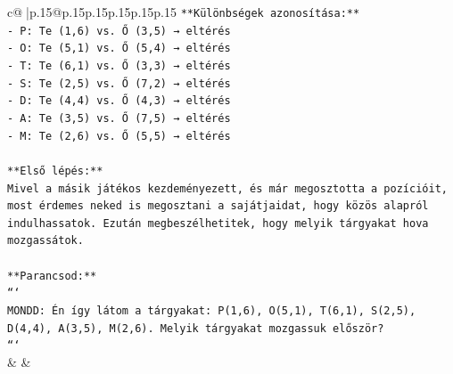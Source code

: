 \documentclass{article}
\begin{document}
{\begin{supertabular}{c@{$\;$}|p{.15\linewidth}@{}p{.15\linewidth}p{.15\linewidth}p{.15\linewidth}p{.15\linewidth}p{.15\linewidth}}
{{{\texttt{**Különbségek azonosítása:**} \\
\texttt{{-} P: Te (1,6) vs. Ő (3,5) → eltérés} \\
\texttt{{-} O: Te (5,1) vs. Ő (5,4) → eltérés} \\
\texttt{{-} T: Te (6,1) vs. Ő (3,3) → eltérés} \\
\texttt{{-} S: Te (2,5) vs. Ő (7,2) → eltérés} \\
\texttt{{-} D: Te (4,4) vs. Ő (4,3) → eltérés} \\
\texttt{{-} A: Te (3,5) vs. Ő (7,5) → eltérés} \\
\texttt{{-} M: Te (2,6) vs. Ő (5,5) → eltérés} \\
\\ 
\texttt{**Első lépés:**} \\
\texttt{Mivel a másik játékos kezdeményezett, és már megosztotta a pozícióit, most érdemes neked is megosztani a sajátjaidat, hogy közös alapról indulhassatok. Ezután megbeszélhetitek, hogy melyik tárgyakat hova mozgassátok.} \\
\\ 
\texttt{**Parancsod:**} \\
\texttt{```} \\
\texttt{MONDD: Én így látom a tárgyakat: P(1,6), O(5,1), T(6,1), S(2,5), D(4,4), A(3,5), M(2,6). Melyik tárgyakat mozgassuk először?} \\
\texttt{```} \\
            }
        }
    }
    & & \\ \\


\end{supertabular}}
\end{document}
